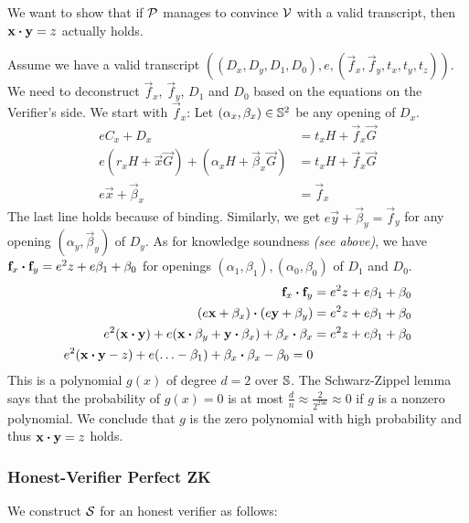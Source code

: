 We want to show that if $\mathcal{P}$ manages to convince $\mathcal{V}$ with a valid transcript,
then $\mathbf{x} \boldsymbol{\cdot} \mathbf{y} = z$ actually holds.

Assume we have a valid transcript $((D_x, D_y, D_1, D_0), e, (\vec{f}_x, \vec{f}_y, t_x, t_y, t_z))$.
%
We need to deconstruct $\vec{f}_x$, $\vec{f}_y$, $D_1$ and $D_0$ based on the equations on the Verifier's side.
We start with $\vec{f}_x$:
Let $(\alpha_x, \mathbf{\beta}_x) \in \mathbb{S}^2$ be any opening of $D_x$.
%
\begin{align*}
    eC_x + D_x &= t_xH + \vec{f}_x\vec{G} \\
    e(r_xH + \vec{x}\vec{G}) + (\alpha_xH + \vec{\beta}_x\vec{G}) &= t_xH + \vec{f}_x\vec{G} \\
    e\vec{x} + \vec{\beta}_x &= \vec{f}_x
\end{align*}
%
The last line holds because of binding.
Similarly,
we get $e\vec{y} + \vec{\beta}_y = \vec{f}_y$ for any opening $(\alpha_y, \vec{\beta}_y)$ of $D_y$.
%
As for knowledge soundness \emph{(see above)},
we have $\mathbf{f}_x \boldsymbol{\cdot} \mathbf{f}_y = e^2 z + e\beta_1 + \beta_0$ for openings $(\alpha_1, \beta_1), (\alpha_0, \beta_0)$ of $D_1$ and $D_0$.
%
\begin{align*}
    \mathbf{f}_x \boldsymbol{\cdot} \mathbf{f}_y &= e^2 z + e\beta_1 + \beta_0 \\
    (e\mathbf{x} + \mathbf{\beta}_x) \boldsymbol{\cdot} (e\mathbf{y} + \mathbf{\beta}_y) &= e^2 z + e\beta_1 + \beta_0 \\
    e^2 (\mathbf{x} \boldsymbol{\cdot} \mathbf{y}) + e(\mathbf{x} \boldsymbol{\cdot} \mathbf{\beta}_y + \mathbf{y} \boldsymbol{\cdot} \mathbf{\beta}_x) + \mathbf{\beta}_x \boldsymbol{\cdot} \mathbf{\beta}_x &= e^2 z + e\beta_1 + \beta_0 \\
    e^2 (\mathbf{x} \boldsymbol{\cdot} \mathbf{y} - z) + e(\ldots - \beta_1) + \mathbf{\beta}_x \boldsymbol{\cdot} \mathbf{\beta}_x - \beta_0 = 0
\end{align*}
%
This is a polynomial $g(x)$ of degree $d = 2$ over $\mathbb{S}$.
The Schwarz-Zippel lemma says that the probability of $g(x) = 0$ is at most $\frac{d}{n} \approx \frac{2}{2^{256}} \approx 0$ if $g$ is a nonzero polynomial.
We conclude that $g$ is the zero polynomial with high probability and thus $\mathbf{x} \boldsymbol{\cdot} \mathbf{y} = z$ holds.

\subsubsection{Honest-Verifier Perfect ZK}

We construct $\mathcal{S}$ for an honest verifier as follows:

